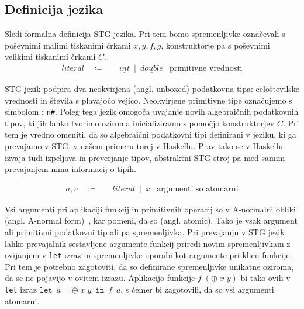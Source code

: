 
\subsection{Definicija jezika}
\label{sec:stg-definicija}


Sledi formalna definicija STG jezika. Pri tem bomo spremenljivke oz\-na\-če\-va\-li s poševnimi malimi tiskanimi črkami $x, y, f, g$, konstruktorje pa s poševnimi velikimi tiskanimi črkami $C$.
\begin{align*}
	literal \quad \coloneq& \quad \underline{int} \enspace \vert \enspace \underline{double} & \text{primitivne vrednosti}
\end{align*}

STG jezik podpira dva neokvirjena (angl. unboxed) podatkovna tipa: celoštevilske vrednosti in števila s plavajočo vejico. Neokvirjene primitivne tipe označujemo s simbolom : \texttt{n\#}. Poleg tega jezik omogoča uvajanje novih algebraičnih podatkovnih tipov, ki jih lahko tvorimo oziroma inicializiramo s pomočjo konstruktorjev $C$. Pri tem je vredno omeniti, da so algebraični podatkovni tipi definirani v jeziku, ki ga prevajamo v STG, v našem primeru torej v Haskellu. Prav tako se v Haskellu izvaja tudi izpeljava in preverjanje tipov, abstraktni STG stroj pa med samim prevajanjem nima informacij o tipih.

\begin{align*}
	a, v \quad \coloneq& \quad literal \enspace \vert \enspace x & \text{argumenti so atomarni}
\end{align*}

Vsi argumenti pri aplikaciji funkcij in primitivnih operacij so v A-normalni obliki (angl. A-normal form)~\cite{flanagan1993essence}, kar pomeni, da so  (angl. atomic). Tako je vsak argument ali primitivni podatkovni tip ali pa spremenljivka. Pri prevajanju v STG jezik lahko prevajalnik sestavljene argumente funkcij priredi novim spremenljivkam z ovijanjem v \texttt{let} izraz in spremenljivke uporabi kot argumente pri klicu funkcije. Pri tem je potrebno zagotoviti, da so definirane spremenljivke unikatne oziroma, da se ne pojavijo v ovitem izrazu. Aplikacijo funkcije $f \; (\oplus \; x \; y)$ bi tako ovili v \texttt{let} izraz $\texttt{let} \enspace a = \oplus \; x \; y \enspace \texttt{in} \enspace f \enspace a$, s čemer bi zagotovili, da so vsi argumenti atomarni.

